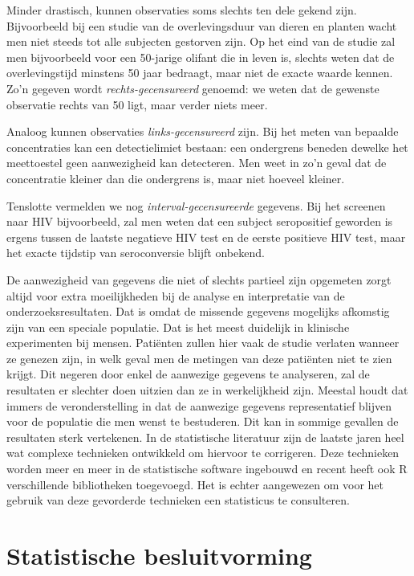 \documentclass[12pt,dutch,coursenotes]{book}
\theoremstyle{definition}
\theoremstyle{definition}
\theoremstyle{definition}
\theoremstyle{remark}
\begin{document}
Minder drastisch, kunnen observaties soms slechts ten dele gekend zijn.
Bijvoorbeeld bij een studie van de overlevingsduur van dieren en planten
wacht men niet steeds tot alle subjecten gestorven zijn. Op het eind van
de studie zal men bijvoorbeeld voor een 50-jarige olifant die in leven
is, slechts weten dat de overlevingstijd minstens 50 jaar bedraagt, maar
niet de exacte waarde kennen. Zo'n gegeven wordt
\emph{rechts-gecensureerd} genoemd: we weten dat de gewenste observatie
rechts van 50 ligt, maar verder niets meer.

Analoog kunnen observaties \emph{links-gecensureerd} zijn. Bij het meten
van bepaalde concentraties kan een detectielimiet bestaan: een
ondergrens beneden dewelke het meettoestel geen aanwezigheid kan
detecteren. Men weet in zo'n geval dat de concentratie kleiner dan die
ondergrens is, maar niet hoeveel kleiner.

Tenslotte vermelden we nog \emph{interval-gecensureerde} gegevens. Bij
het screenen naar HIV bijvoorbeeld, zal men weten dat een subject
seropositief geworden is ergens tussen de laatste negatieve HIV test en
de eerste positieve HIV test, maar het exacte tijdstip van seroconversie
blijft onbekend.

De aanwezigheid van gegevens die niet of slechts partieel zijn opgemeten
zorgt altijd voor extra moeilijkheden bij de analyse en interpretatie
van de onderzoeksresultaten. Dat is omdat de missende gegevens mogelijks
afkomstig zijn van een speciale populatie. Dat is het meest duidelijk in
klinische experimenten bij mensen. Patiënten zullen hier vaak de studie
verlaten wanneer ze genezen zijn, in welk geval men de metingen van deze
patiënten niet te zien krijgt. Dit negeren door enkel de aanwezige
gegevens te analyseren, zal de resultaten er slechter doen uitzien dan
ze in werkelijkheid zijn. Meestal houdt dat immers de veronderstelling
in dat de aanwezige gegevens representatief blijven voor de populatie
die men wenst te bestuderen. Dit kan in sommige gevallen de resultaten
sterk vertekenen. In de statistische literatuur zijn de laatste jaren
heel wat complexe technieken ontwikkeld om hiervoor te corrigeren. Deze
technieken worden meer en meer in de statistische software ingebouwd en
recent heeft ook R verschillende bibliotheken toegevoegd. Het is echter
aangewezen om voor het gebruik van deze gevorderde technieken een
statisticus te consulteren.

\chapter{Statistische besluitvorming}\label{chap:besluit}
\end{document}
